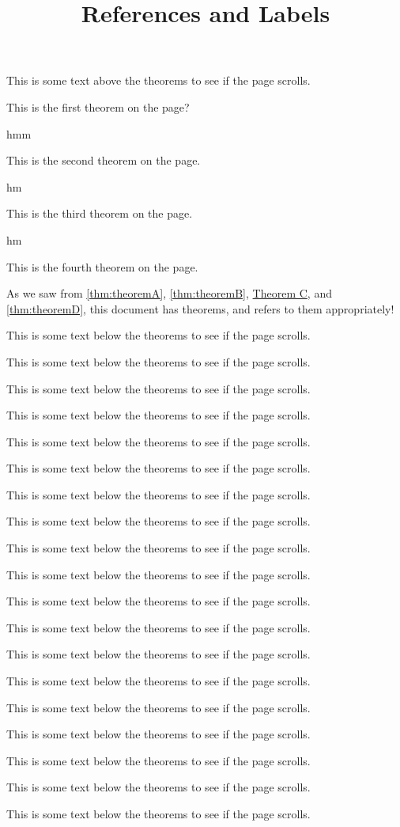 \documentclass{ximera}
\begin{document}
\title{References and Labels}

This is some text above the theorems to see if the page scrolls.

\begin{theorem}
\label{thm:theoremA} This is the first theorem on the page?
\end{theorem}

hmm

\begin{theorem}
\label{thm:theoremB} This is the second theorem on the page.
\end{theorem}

hm

\begin{theorem}
\label{thm:theoremC} This is the third theorem on the page.
\end{theorem}

hm


\begin{theorem}
\label{thm:theoremD} This is the fourth theorem on the page.
\end{theorem}

As we saw from \autoref{thm:theoremA}, \ref{thm:theoremB}, \hyperref[thm:theoremC]{Theorem C}, and \autoref{thm:theoremD}, this document has theorems, and refers to them appropriately!

This is some text below the theorems to see if the page scrolls.

This is some text below the theorems to see if the page scrolls.

This is some text below the theorems to see if the page scrolls.

This is some text below the theorems to see if the page scrolls.

This is some text below the theorems to see if the page scrolls.

This is some text below the theorems to see if the page scrolls.

This is some text below the theorems to see if the page scrolls.

This is some text below the theorems to see if the page scrolls.

This is some text below the theorems to see if the page scrolls.

This is some text below the theorems to see if the page scrolls.

This is some text below the theorems to see if the page scrolls.

This is some text below the theorems to see if the page scrolls.

This is some text below the theorems to see if the page scrolls.

This is some text below the theorems to see if the page scrolls.

This is some text below the theorems to see if the page scrolls.

This is some text below the theorems to see if the page scrolls.

This is some text below the theorems to see if the page scrolls.

This is some text below the theorems to see if the page scrolls.

This is some text below the theorems to see if the page scrolls.
\end{document}
